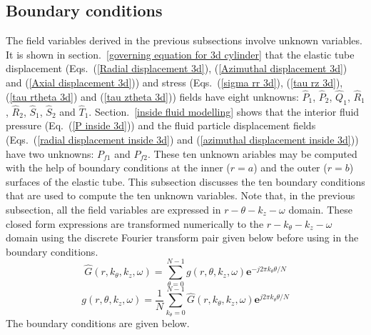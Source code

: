\documentclass[twocolumn,10pt]{asme2ej}
\begin{document}
\subsection{Boundary conditions}\label{BCS}
The field variables derived in the previous subsections involve unknown variables. It is shown in section.~\ref{governing equation for 3d cylinder} that the elastic tube displacement (Eqs.~(\ref{Radial displacement 3d}), (\ref{Azimuthal displacement 3d}) and (\ref{Axial displacement 3d})) and stress (Eqs.~(\ref{sigma rr 3d}), (\ref{tau rz 3d}), (\ref{tau rtheta 3d}) and (\ref{tau ztheta 3d})) fields have eight unknowns: $\hat{P}_1$, $\hat{P}_2$, $\hat{Q}_1$, $\hat{R}_1$, $\hat{R}_2$, $\hat{S}_1$, $\hat{S}_2$ and $\hat{T}_1$. Section.~\ref{inside fluid modelling} shows that the interior fluid pressure (Eq.~(\ref{P inside 3d})) and the fluid particle displacement fields (Eqs.~(\ref{radial displacement inside 3d}) and (\ref{azimuthal displacement inside 3d})) have two unknowns: $P_{f1}$ and $P_{f2}$. These ten unknown ariables may be computed with the help of boundary conditions at the inner ($r=a$) and the outer ($r=b$) surfaces of the elastic tube. This subsection discusses the ten boundary conditions that are used to compute the ten unknown variables. Note that, in the previous subsection, all the field variables are expressed in $r-\theta-k_z-\omega$ domain. These closed form expressions are transformed numerically to the $r-k_\theta-k_z-\omega$ domain using the discrete Fourier transform pair given below before using in the boundary conditions.
\begin{equation}\label{Forward Fourier tranform theta}
    \hat{G}(r,k_\theta,k_z,\omega) = \sum_{\theta=0}^{N-1} g(r,\theta,k_z,\omega)\mathbf{e}^{-j2\pi k_\theta\theta/N}
\end{equation}
\begin{equation}\label{Backward Fourier transform theta}
    g(r,\theta,k_z,\omega) = \frac{1}{N}\sum_{k_\theta = 0}^{N-1}\hat{G}(r,k_\theta,k_z,\omega)\mathbf{e}^{j2\pi k_\theta \theta/N}
\end{equation}
The boundary conditions are given below.
\end{document}
